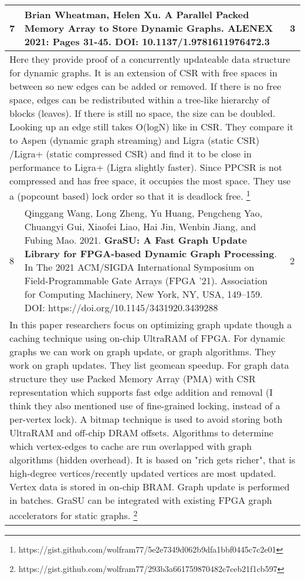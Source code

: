 \begin{longtable}[!hbtp]{|p{1cm}|p{11cm}|p{2cm}|}
  7 &
  Brian Wheatman, Helen Xu. \textbf{A Parallel Packed Memory Array to Store Dynamic Graphs}. ALENEX 2021: Pages 31-45.\linebreak
  DOI: 10.1137/1.9781611976472.3 &
  3 \\ \hline
  \multicolumn{3}{|p{14cm}|}{Here they provide proof of a concurrently updateable data structure for dynamic graphs. It is an extension of CSR with free spaces in between so new edges can be added or removed. If there is no free space, edges can be redistributed within a tree-like hierarchy of blocks (leaves). If there is still no space, the size can be doubled. Looking up an edge still takes O(logN) like in CSR. They compare it to Aspen (dynamic graph streaming) and Ligra (static CSR) /Ligra+ (static compressed CSR) and find it to be close in performance to Ligra+ (Ligra slightly faster). Since PPCSR is not compressed and has free space, it occupies the most space. They use a (popcount based) lock order so that it is deadlock free. \footnote{https://gist.github.com/wolfram77/5e2e7349d062b9dfa1bbf0445c7c2e01}} \\ \hline

  8 &
  Qinggang Wang, Long Zheng, Yu Huang, Pengcheng Yao, Chuangyi Gui, Xiaofei Liao, Hai Jin, Wenbin Jiang, and Fubing Mao. 2021. \textbf{GraSU: A Fast Graph Update Library for FPGA-based Dynamic Graph Processing}. In The 2021 ACM/SIGDA International Symposium on Field-Programmable Gate Arrays (FPGA '21). Association for Computing Machinery, New York, NY, USA, 149–159.\linebreak
  DOI: https://doi.org/10.1145/3431920.3439288 &
  2 \\ \hline
  \multicolumn{3}{|p{14cm}|}{In this paper researchers focus on optimizing graph update though a caching technique using on-chip UltraRAM of FPGA. For dynamic graphs we can work on graph update, or graph algorithms. They work on graph updates. They list geomean speedup. For graph data structure they use Packed Memory Array (PMA) with CSR representation which supports fast edge addition and removal (I think they also mentioned use of fine-grained locking, instead of a per-vertex lock). A bitmap technique is used to avoid storing both UltraRAM and off-chip DRAM offsets. Algorithms to determine which vertex-edges to cache are run overlapped with graph algorithms (hidden overhead). It is based on "rich gets richer", that is high-degree vertices/recently updated vertices are most updated. Vertex data is stored in on-chip BRAM. Graph update is performed in batches. GraSU can be integrated with existing FPGA graph accelerators for static graphs. \footnote{https://gist.github.com/wolfram77/293b3a661759870482c7ceb21f1cb597}} \\ \hline


\end{longtable}
